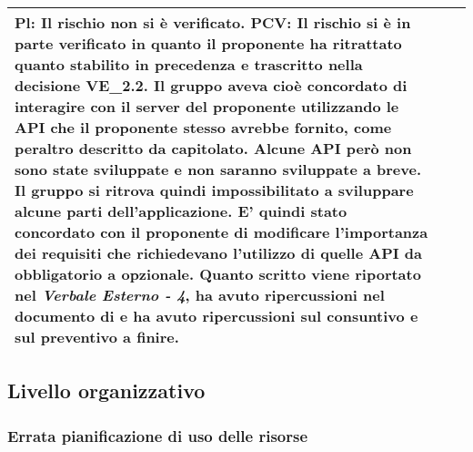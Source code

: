 \begin{table}[H]
\begin{center}
\begin{tabular}{p{2.5cm}p{0.5cm}p{11cm}}
				\textbf{Pl}: Il rischio non si è verificato.
				\newline
				\textbf{PCV}: Il rischio si è in parte verificato in quanto il proponente ha ritrattato quanto stabilito in precedenza e trascritto nella decisione VE\_2.2. Il gruppo aveva cioè concordato di interagire con il server del proponente utilizzando le API che il proponente stesso avrebbe fornito, come peraltro descritto da capitolato. Alcune API però non sono state sviluppate e non saranno sviluppate a breve. Il gruppo si ritrova quindi impossibilitato a sviluppare alcune parti dell'applicazione. E' quindi stato concordato con il proponente di modificare l'importanza dei requisiti che richiedevano l'utilizzo di quelle API da obbligatorio a opzionale. Quanto scritto viene riportato nel \textit{Verbale Esterno - 4}, ha avuto ripercussioni nel documento di \adr{} e ha avuto ripercussioni sul consuntivo e sul preventivo a finire.	\\
				
				\bottomrule	
			\end{tabular}
		\end{center}
	\end{table}			
	
	
	\newpage
	\subsection{Livello organizzativo}
	\subsubsection {Errata pianificazione di uso delle risorse}
	\label{subsec:errataPianificazione}
	
